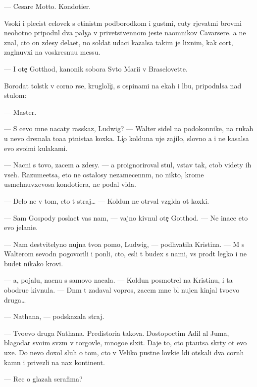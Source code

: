 \documentclass[10pt]{book}
\begin{document}
— Cesare Motto. Kondotier.

V{\yi}soki{\y} i plecist{\yi}{\y} celovek s {\x}etinist{\yi}m podborodkom i gust{\yi}mi, cuty r{\yi}je\-va\-t{\yi}\-mi brov{\ia}mi neohotno pripodn{\ia}l dva paly{\c}a v privetstvennom jeste na{\y}om\-ni\-kov Cavarsere. {\Y}a ne znal, cto on zdesy dela{\y}et, no soldat udaci kazalsa takim je lixnim, kak cort, zagl{\ia}nuvxi{\y} na voskresnu{\y}u messu.

— I ote{\c} Gotthod, kanonik sobora Sv{\ia}to{\y} Mari{\y}i v Braselovette.

Borodat{\yi}{\y} tolst{\ia}k v corno{\y} r{\ia}se, krugloli{\c}i{\y}, s ospinami na {\x}ekah i lbu, pri\-podn{\ia}l\-sa nad stulom:

— Master.

— S cevo mne nacaty rasskaz, Ludwig? — Walter sidel na podokonnike, na rukah u nevo dremala to{\x}a{\y}a p{\ia}tnista{\y}a koxka. Li{\c}o kolduna uje zajilo, slovno {\y}a i ne kasalsa {\y}evo svo{\y}imi kulakami.

— Nacni s tovo, zacem {\y}a zdesy. — {\Y}a proignoriroval stul, vstav tak, ctob{\yi} videty ih vseh. Razume{\y}etsa, eto ne ostalosy nezamecenn{\yi}m, no nikto, krome usmeh\-nuv\-xe\-vosa kondotiera, ne podal vida.

— Delo ne v tom, cto t{\yi} straj… — Koldun ne otr{\yi}val vzgl{\ia}da ot koxki.

— Sam Gospody pos{\yi}la{\y}et vas nam, — vajno kivnul ote{\c} Gotthod. — Ne inace eto {\y}evo jelani{\y}e.

— Nam de{\y}stvitelyno nujna tvo{\y}a pomo{\x}, Ludwig, — podhvatila Kristina. — M{\yi} s Walterom sevodn{\ia} pogovorili i pon{\ia}li, cto, {\y}esli t{\yi} budex s nami, vs{\e} pro{\y}d{\e}t legko i ne budet nikako{\y} krovi.

— {\Y}a, pojalu{\y}, nacnu s samovo nacala. — Koldun posmotrel na Kristinu, i ta obodr{\ia}{\y}u{\x}e kivnula. — Dn{\e}m t{\yi} zadaval vopros, zacem mne b{\yi}l nujen kinjal tvo{\y}evo druga…

— Nathana, — podskazala straj.

— Tvo{\y}evo druga Nathana. Predistori{\y}a takova. Dostopoctim{\yi}{\y} Adil al Juma, blagodar{\ia} svo{\y}im sv{\ia}z{\ia}m v torgovle, mnogo{\y}e sl{\yi}xit. Daje to, cto p{\yi}ta{\y}utsa skr{\yi}\-ty ot {\y}evo uxe{\y}. Do nevo doxol sluh o tom, cto v Veliko{\y} pust{\yi}ne lovki{\y}e l{\io}di ot{\yi}skali dva corn{\yi}h kamn{\ia} i privezli na nax kontinent.

— Rec o glazah serafima?
\end{document}
